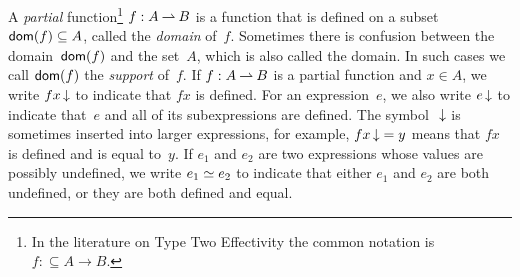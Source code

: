 A \emph{partial} function\footnote{In the literature on Type Two
  Effectivity the common notation is $f \mathbin{{:}{\subseteq}} A \to
  B$.} $f: A \mathbin{\rightharpoonup} B$ is a function that is defined on a subset
$\mathsf{dom}(f) \subseteq A$, called the \emph{domain} of~$f$. Sometimes
there is confusion between the domain~$\mathsf{dom}(f)$ and the set~$A$, which
is also called the domain. In such cases we call $\mathsf{dom}(f)$ the
\emph{support} of~$f$. If $f: A \mathbin{\rightharpoonup} B$ is a partial function and $x
\in A$, we write $f x \,{\downarrow}$ to indicate that $f x$ is defined. For
an expression~$e$, we also write $e \,{\downarrow}$ to indicate that~$e$ and
all of its subexpressions are defined. The symbol~$\,{\downarrow}$ is
sometimes inserted into larger expressions, for example, $f x \,{\downarrow}
= y$ means that $f x$ is defined and is equal to~$y$. If $e_1$ and
$e_2$ are two expressions whose values are possibly undefined, we
write $e_1 \simeq e_2$ to indicate that either $e_1$ and $e_2$ are both
undefined, or they are both defined and equal.




